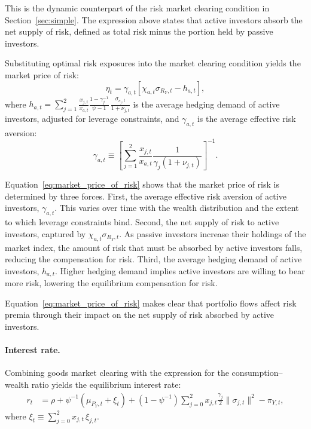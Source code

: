 \documentclass[12pt,english]{article}
\begin{document}
This is the dynamic counterpart of the risk market clearing condition in Section~\ref{sec:simple}.
The expression above states that active investors absorb the net supply of risk, defined as total risk minus the portion held by passive investors.

Substituting optimal risk exposures into the market clearing condition yields the market price of risk:
\begin{equation}\label{eq:market_price_of_risk}
    \eta_t = \gamma_{a,t} \left[\chi_{a,t}\sigma_{R_Y,t} - h_{a,t}\right],
\end{equation}
where $h_{a,t} = \sum_{j=1}^2 \frac{x_{j,t}}{x_{a,t}} \frac{1-\gamma_j^{-1}}{\psi-1} \, \frac{\sigma_{c_j,t}}{1+\nu_{j,t}}$ is the average hedging demand of active investors, adjusted for leverage constraints, and $\gamma_{a,t}$ is the average effective risk aversion:
\begin{equation}
    \gamma_{a,t} \equiv \left[\sum_{j=1}^2 \frac{x_{j,t}}{x_{a,t}} \frac{1}{\gamma_j(1+\nu_{j,t})}\right]^{-1}.
\end{equation}

Equation~\eqref{eq:market_price_of_risk} shows that the market price of risk is determined by three forces.
First, the average effective risk aversion of active investors, $\gamma_{a,t}$.
This varies over time with the wealth distribution and the extent to which leverage constraints bind.
Second, the net supply of risk to active investors, captured by $\chi_{a,t}\sigma_{R_Y,t}$.
As passive investors increase their holdings of the market index, the amount of risk that must be absorbed by active investors falls, reducing the compensation for risk.
Third, the average hedging demand of active investors, $h_{a,t}$.
Higher hedging demand implies active investors are willing to bear more risk, lowering the equilibrium compensation for risk.

Equation~\eqref{eq:market_price_of_risk} makes clear that portfolio flows affect risk premia through their impact on the net supply of risk absorbed by active investors.

\paragraph{Interest rate.}
Combining goods market clearing with the expression for the consumption--wealth ratio yields the equilibrium interest rate:
\begin{align}\label{eq:interest_rate}
    r_t &= \rho 
    + \psi^{-1} \left(\mu_{P_Y,t} + \xi_t \right)
    + (1-\psi^{-1}) \sum_{j=0}^2 x_{j,t} 
        \frac{\gamma_j}{2} \|\sigma_{j,t}\|^2
    - \pi_{Y,t},
\end{align}
where $\xi_t \equiv \sum_{j=0}^2 x_{j,t} \, \xi_{j,t}$.
\end{document}
